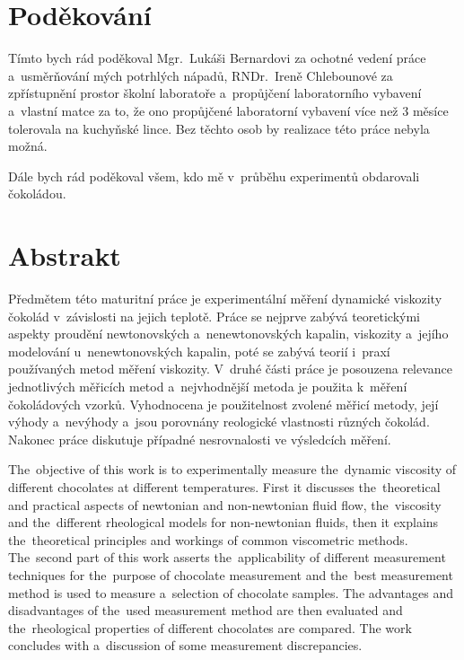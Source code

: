 \documentclass[12pt]{article}
\begin{document}
\pagestyle{empty}

\addtocounter{page}{2}
\newpage
\section*{Poděkování}
Tímto bych rád poděkoval Mgr.~Lukáši Bernardovi za ochotné vedení práce a~usměrňování mých potrhlých nápadů, RNDr.~Ireně Chlebounové za zpřístupnění prostor školní laboratoře a~propůjčení laboratorního vybavení a~vlastní matce za to, že ono propůjčené laboratorní vybavení více než 3 měsíce tolerovala na kuchyňské lince. Bez těchto osob by realizace této práce nebyla možná.
\par\noindent
Dále bych rád poděkoval všem, kdo mě v~průběhu experimentů obdarovali čokoládou.

\newpage
\section*{Abstrakt}
Předmětem této maturitní práce je experimentální měření dynamické viskozity čokolád v~závislosti na jejich teplotě. Práce se nejprve zabývá teoretickými aspekty proudění newtonovských a~nenewtonovských kapalin, viskozity a~jejího modelování u~nenewtonovských kapalin, poté se zabývá teorií i~praxí používaných metod měření viskozity. V~druhé části práce je posouzena relevance jednotlivých měřicích metod a~nejvhodnější metoda je použita k~měření čokoládových vzorků. Vyhodnocena je použitelnost zvolené měřicí metody, její výhody a~nevýhody a~jsou porovnány reologické vlastnosti různých čokolád. Nakonec práce diskutuje případné nesrovnalosti ve výsledcích měření.
\par\medskip\noindent
The~objective of this work is to experimentally measure the~dynamic viscosity of different chocolates at different temperatures. First it discusses the~theoretical and practical aspects of newtonian and non-newtonian fluid flow, the~viscosity and the~different rheological models for non-newtonian fluids, then it explains the~theoretical principles and workings of common viscometric methods. The~second part of this work asserts the~applicability of different measurement techniques for the~purpose of chocolate measurement and the~best measurement method is used to measure a~selection of chocolate samples. The advantages and disadvantages of the~used measurement method are then evaluated and the~rheological properties of different chocolates are compared. The work concludes with a~discussion of some measurement discrepancies.
\end{document}
